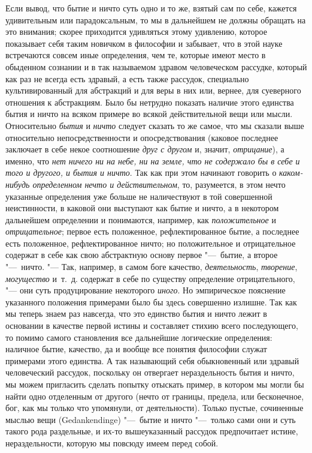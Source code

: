 Если вывод, что бытие и ничто суть одно и то же, взятый сам по себе, кажется
удивительным или парадоксальным, то мы в дальнейшем не должны обращать на
это внимания; скорее приходится удивляться этому удивлению, которое
показывает себя таким новичком в философии и забывает, что в этой науке
встречаются совсем иные определения, чем те, которые имеют место в
обыденном сознании и в так называемом здравом человеческом рассудке,
который как раз не всегда есть здравый, а есть также рассудок, специально
культивированный для абстракций и для веры в них или, вернее, для
суеверного отношения к абстракциям. Было бы нетрудно показать наличие этого
единства бытия и ничто на всяком примере во всякой действительной вещи или
мысли. Относительно {\em бытия} и
{\em ничто} следует сказать то же самое, что мы сказали
выше относительно непосредственности и опосредствования (каковое последнее
заключает в себе некое соотношение {\em друг с другом}
и, значит, {\em отрицание}), а именно, что
{\em нет ничего ни на небе, ни на земле, что не
содержало бы в себе и того и другого, и бытия и ничто}. Так как при этом
начинают говорить о {\em каком-нибудь определенном
нечто и действительном}, то, разумеется, в этом нечто указанные определения
уже больше не наличествуют в той совершенной неистинности, в каковой они
выступают как бытие и ничто, а в некотором дальнейшем определении и
понимаются, например, как {\em положительное} и
{\em отрицательное}; первое есть положенное,
рефлектированное бытие, а последнее есть положенное, рефлектированное
ничто; но положительное и отрицательное содержат в себе как свою
абстрактную основу первое "---~бытие, а второе "---~ничто. "--- Так, например, в
самом боге качество, {\em деятельность},
{\em творение}, {\em могущество}
и~т.~д. содержат в себе по существу определение отрицательного, "--- они суть
продуцирование некоторого {\em иного}. Но
эмпирическое пояснение указанного положения примерами было бы здесь
совершенно излишне. Так как мы теперь знаем раз навсегда, что это единство
бытия и ничто лежит в основании в качестве первой истины и составляет
стихию всего последующего, то помимо самого становления все дальнейшие
логические определения: наличное бытие, качество, да и вообще все понятия
философии служат примерами этого единства. А так называющий себя
обыкновенный или здравый человеческий рассудок, поскольку он отвергает
нераздельность бытия и ничто, мы можем пригласить сделать попытку отыскать
пример, в котором мы могли бы найти одно отделенным от другого (нечто от
границы, предела, или бесконечное, бог, как мы только что упомянули, от
деятельности). Только пустые, сочиненные мыслью вещи (Gedankendinge)
"---~бытие и ничто "---~только сами они и суть такого рода раздельные, и их-то
вышеуказанный рассудок предпочитает истине, нераздельности, которую мы
повсюду имеем перед собой.

